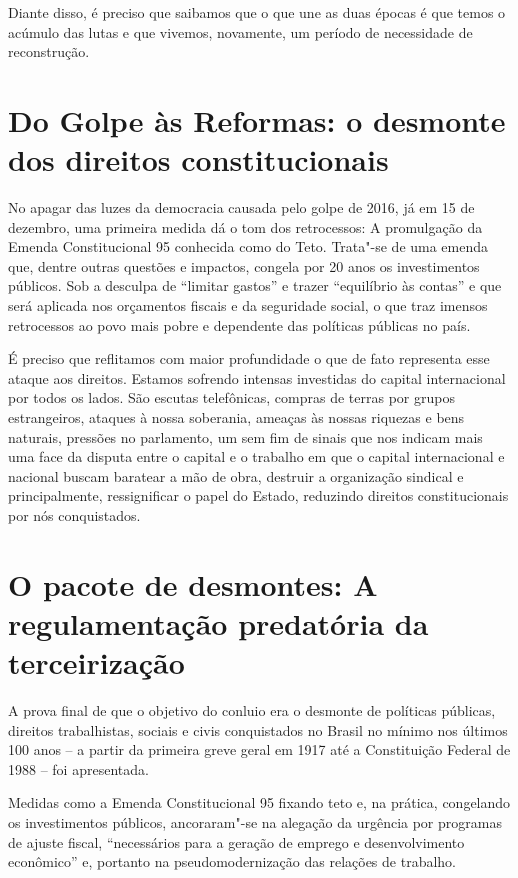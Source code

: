 Diante disso, é preciso que saibamos que o que une as duas épocas é que
temos o acúmulo das lutas e que vivemos, novamente, um período de
necessidade de reconstrução.

\section{Do Golpe às Reformas: o desmonte dos direitos constitucionais}

No apagar das luzes da democracia causada pelo golpe de 2016, já em 15
de dezembro, uma primeira medida dá o tom dos retrocessos: A promulgação
da Emenda Constitucional 95 conhecida como  do Teto. Trata"-se de uma
emenda que, dentre outras questões e impactos, congela por 20 anos os
investimentos públicos. Sob a desculpa de ``limitar gastos'' e trazer
``equilíbrio às contas'' e que será aplicada nos orçamentos fiscais e da
seguridade social, o que traz imensos retrocessos ao povo mais pobre e
dependente das políticas públicas no país.

É preciso que reflitamos com maior profundidade o que de fato representa
esse ataque aos direitos. Estamos sofrendo intensas investidas do
capital internacional por todos os lados. São escutas telefônicas,
compras de terras por grupos estrangeiros, ataques à nossa soberania,
ameaças às nossas riquezas e bens naturais, pressões no parlamento, um
sem fim de sinais que nos indicam mais uma face da disputa entre o
capital e o trabalho em que o capital internacional e nacional buscam
baratear a mão de obra, destruir a organização sindical e
principalmente, ressignificar o papel do Estado, reduzindo direitos
constitucionais por nós conquistados.

\section{O pacote de desmontes: A regulamentação predatória da
terceirização}

A prova final de que o objetivo do conluio era o desmonte de políticas
públicas, direitos trabalhistas, sociais e civis conquistados no Brasil
no mínimo nos últimos 100 anos -- a partir da primeira greve geral em
1917 até a Constituição Federal de 1988 -- foi apresentada.

Medidas como a Emenda Constitucional 95 fixando teto e, na prática,
congelando os investimentos públicos, ancoraram"-se na alegação da
urgência por programas de ajuste fiscal, ``necessários para a geração de
emprego e desenvolvimento econômico'' e, portanto na pseudomodernização
das relações de trabalho.

